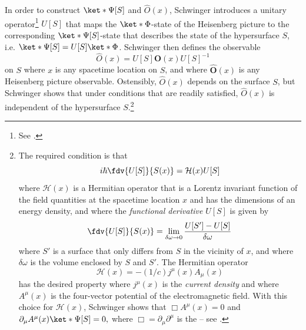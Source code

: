 \documentclass[12pt]{report}
\begin{document}
In order to construct $\ket*{\Psi[S]}$ and $\hat{O}(x)$, Schwinger introduces a unitary operator\footnote{See \cite[p. 1448]{SchwingerJulianI}.} $U[S]$ \label{SchwingerOperator}  %
%
that maps the $\ket*{\Phi}$-state of the Heisenberg picture to the corresponding $\ket*{\Psi[S]}$-state that describes the state of the hypersurface $S$, i.e. $\ket*{\Psi[S]}=U[S]\ket*{\Phi}$. Schwinger then defines the observable  
\begin{equation}\label{tsobservable}
  \hat{O}(x)=U[S]\hat{\bm{O}}(x)U[S]^{-1}
\end{equation}
on $S$ where $x$ is any spacetime location on $S$, and where $\hat{\bm{O}}(x)$ is any Heisenberg picture observable. Ostensibly, $\hat{O}(x)$ depends on the surface $S$,  but Schwinger shows that under conditions that are readily satisfied, $\hat{O}(x)$ is independent of the hypersurface $S$.\footnote{
  The required condition is that 
  $$i\hbar\fdv{U[S]}{S(x)}=\mathcal{H}(x)U[S] $$
  where $\mathcal{H}(x)$ is a Hermitian operator that is a Lorentz invariant function of the field quantities at the spacetime location $x$ and has the dimensions of an energy density, and where the \emph{functional derivative} $U[S]$ is given by
  \begin{equation}\label{fddef}
  \fdv{U[S]}{S(x)}=\lim_{\delta \omega\rightarrow 0}\frac{U[S']-U[S]}{\delta\omega}
  \end{equation}%
  where $S'$ is a surface that only differs from $S$ in the vicinity of $x$, and where $\delta\omega$ is the volume enclosed by $S$ and $S'$. The Hermitian operator $$\mathcal{H}(x)=-(1/c)j^\mu(x)A_\mu(x)$$
  has the desired property where $j^\mu(x)$ %
  is the \emph{current density} and where $A^\mu(x)$ %
   is the four-vector potential of the electromagnetic field. With this choice for $\mathcal{H}(x)$, Schwinger shows that $\Box A^\mu(x)=0$ and $\partial_\mu A^\mu(x)\ket*{\Psi[S]}=0,$ where $\Box=\partial_\mu\partial^\mu$ is %
    the  -- see \cite[p. 1449-1450]{SchwingerJulianI}.\label{Sindepedence}  }
\end{document}
